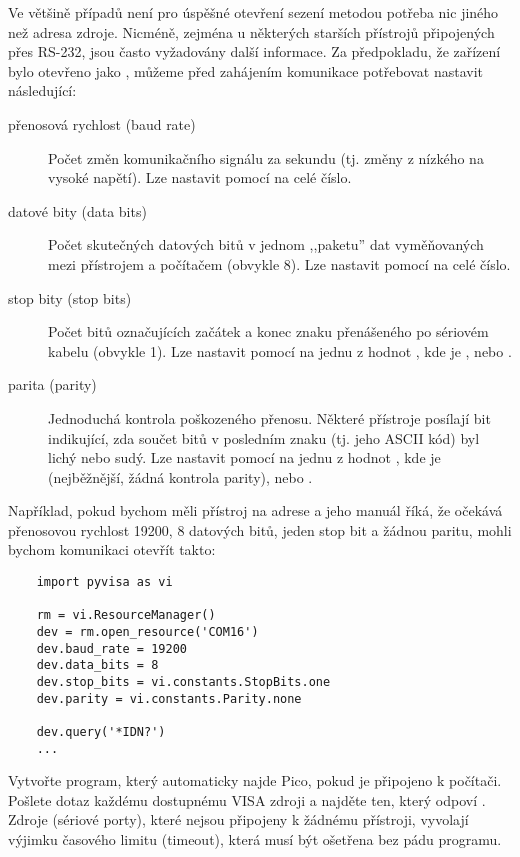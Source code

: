 Ve většině případů není pro úspěšné otevření sezení metodou  potřeba nic jiného než adresa zdroje. Nicméně, zejména u některých starších přístrojů připojených přes RS-232, jsou často vyžadovány další informace. Za předpokladu, že zařízení bylo otevřeno jako , můžeme před zahájením komunikace potřebovat nastavit následující:
\begin{description}
    \item[přenosová rychlost (baud rate)] Počet změn komunikačního signálu za sekundu (tj. změny z nízkého na vysoké napětí). Lze nastavit pomocí  na celé číslo.
    \item[datové bity (data bits)] Počet skutečných datových bitů v jednom ,,paketu'' dat vyměňovaných mezi přístrojem a počítačem (obvykle 8). Lze nastavit pomocí  na celé číslo.
    \item[stop bity (stop bits)] Počet bitů označujících začátek a konec znaku přenášeného po sériovém kabelu (obvykle 1). Lze nastavit pomocí  na jednu z hodnot , kde  je ,  nebo .
    \item[parita (parity)] Jednoduchá kontrola poškozeného přenosu. Některé přístroje posílají bit indikující, zda součet bitů v posledním znaku (tj. jeho ASCII kód) byl lichý nebo sudý. Lze nastavit pomocí  na jednu z hodnot , kde  je  (nejběžnější, žádná kontrola parity),  nebo .
\end{description}
Například, pokud bychom měli přístroj na adrese  a jeho manuál říká, že očekává přenosovou rychlost 19200, 8 datových bitů, jeden stop bit a žádnou paritu, mohli bychom komunikaci otevřít takto:
\begin{lstlisting}
    import pyvisa as vi

    rm = vi.ResourceManager()
    dev = rm.open_resource('COM16')
    dev.baud_rate = 19200
    dev.data_bits = 8
    dev.stop_bits = vi.constants.StopBits.one
    dev.parity = vi.constants.Parity.none

    dev.query('*IDN?')
    ...
\end{lstlisting}

\begin{exercise}
    Vytvořte program, který automaticky najde Pico, pokud je připojeno k počítači. Pošlete dotaz  každému dostupnému VISA zdroji a najděte ten, který odpoví . Zdroje (sériové porty), které nejsou připojeny k žádnému přístroji, vyvolají výjimku časového limitu (timeout), která musí být ošetřena bez pádu programu.
\end{exercise}

